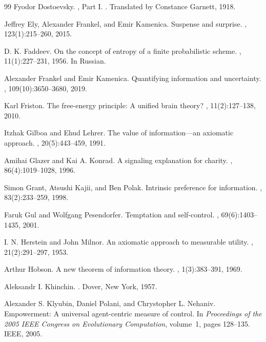 \documentclass[11pt,a4paper]{article}
\theoremstyle{definition}
\newcommand{\1}{\mathbf 1}
\begin{document}
\begin{thebibliography}{99}
Fyodor Dostoevsky.
, Part I.
.  Translated by Constance Garnett, 1918.

Jeffrey Ely, Alexander Frankel, and Emir Kamenica.
\newblock Suspense and surprise.
, 123(1):215--260, 2015.

D. K. Faddeev.
\newblock On the concept of entropy of a finite probabilistic scheme.
, 11(1):227--231, 1956.
\newblock In Russian.

Alexander Frankel and Emir Kamenica.
\newblock Quantifying information and uncertainty.
, 109(10):3650--3680, 2019.

Karl Friston.
\newblock The free-energy principle: A unified brain theory?
, 11(2):127--138, 2010.

Itzhak Gilboa and Ehud Lehrer.
\newblock The value of information---an axiomatic approach.
, 20(5):443--459, 1991.

Amihai Glazer and Kai A. Konrad.
\newblock A signaling explanation for charity.
, 86(4):1019--1028, 1996.

Simon Grant, Atsushi Kajii, and Ben Polak.
\newblock Intrinsic preference for information.
, 83(2):233--259, 1998.

Faruk Gul and Wolfgang Pesendorfer.
\newblock Temptation and self-control.
, 69(6):1403--1435, 2001.

I. N. Herstein and John Milnor.
\newblock An axiomatic approach to measurable utility.
, 21(2):291--297, 1953.

Arthur Hobson.
\newblock A new theorem of information theory.
, 1(3):383--391, 1969.

Aleksandr I. Khinchin.
.
\newblock Dover, New York, 1957.

Alexander S. Klyubin, Daniel Polani, and Chrystopher L. Nehaniv.
\newblock Empowerment: A universal agent-centric measure of control.
\newblock In {\em Proceedings of the 2005 IEEE Congress on Evolutionary Computation}, volume~1, pages 128--135. IEEE,
  2005.


\end{thebibliography}
\end{document}

